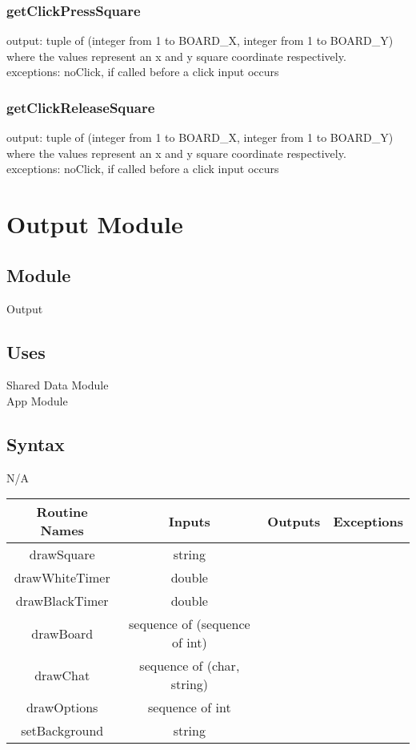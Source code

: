 \documentclass[12pt, titlepage]{article}
\begin{document}
        \subsubsection*{getClickPressSquare} 
            output: tuple of (integer from 1 to BOARD\_X, integer from 1 to BOARD\_Y) where the values represent an x and y square coordinate respectively. \\
            exceptions: noClick, if called before a click input occurs
        
        \subsubsection*{getClickReleaseSquare} 
            output: tuple of (integer from 1 to BOARD\_X, integer from 1 to BOARD\_Y) where the values represent an x and y square coordinate respectively. \\
            exceptions: noClick, if called before a click input occurs
        
\newpage
\section*{Output Module}
    \subsection*{Module}
        Output
    
    \subsection*{Uses}
        Shared Data Module \\
        App Module
    
    \subsection*{Syntax}
        N/A
        
        \begin{center}
            \begin{tabular}{|c|c|c|c|} 
                \hline
                Routine Names & Inputs & Outputs & Exceptions \\
                \hline
                drawSquare & string & &  \\ 
                \hline
                drawWhiteTimer & double &  &  \\ 
                \hline
                drawBlackTimer & double &  &  \\ 
                \hline
                drawBoard & sequence of (sequence of int) &  &  \\ 
                \hline
                drawChat & sequence of (char, string) &  &  \\ 
                \hline
                drawOptions & sequence of int &  &  \\ 
                \hline
                setBackground & string  &  &  \\ 
                \hline
            \end{tabular}
        \end{center}
    
\end{document}
